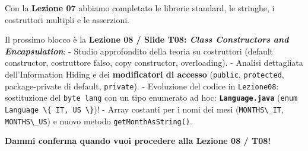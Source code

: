 \documentclass[11pt,a4paper]{article}
\newcommand{\passthrough}[1]{#1}
\begin{document}
\begin{studynote} Con la \textbf{Lezione 07} abbiamo completato le librerie
standard, le stringhe, i costruttori multipli e le asserzioni.

Il prossimo blocco è la \textbf{Lezione 08 / Slide T08: \emph{Class
Constructors and Encapsulation}}: - Studio approfondito della teoria su
costruttori (default constructor, costruttore falso, copy constructor,
overloading). - Analisi dettagliata dell'Information Hiding e dei
\textbf{modificatori di accesso} (\passthrough{\lstinline!public!},
\passthrough{\lstinline!protected!}, package-private di default,
\passthrough{\lstinline!private!}). - Evoluzione del codice in
\passthrough{\lstinline!Lezione08!}: sostituzione del
\passthrough{\lstinline!byte lang!} con un tipo enumerato ad hoc:
\textbf{\passthrough{\lstinline!Language.java!}}
(\passthrough{\lstinline!enum Language \{ IT, US \}!})! - Array costanti
per i nomi dei mesi (\passthrough{\lstinline!MONTHS\_IT!},
\passthrough{\lstinline!MONTHS\_US!}) e nuovo metodo
\passthrough{\lstinline!getMonthAsString()!}.
\end{studynote}

\textbf{Dammi conferma quando vuoi procedere alla Lezione 08 / T08!}
\end{document}
